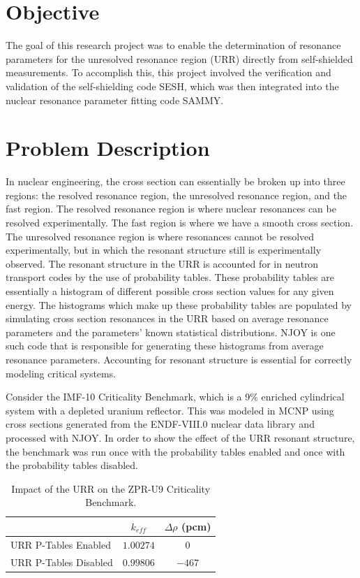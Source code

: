 \section{Objective}
    The goal of this research project was to enable the determination of resonance parameters for the unresolved resonance region (URR) directly from self-shielded measurements. To accomplish this, this project involved the verification and validation of the self-shielding code SESH\cite{sesh}, which was then integrated into the nuclear resonance parameter fitting code SAMMY\cite{sammy}.


\section{Problem Description}

    In nuclear engineering, the cross section can essentially be broken up into three regions: the resolved resonance region, the unresolved resonance region, and the fast region. The resolved resonance region is where nuclear resonances can be resolved experimentally. The fast region is where we have a smooth cross section. The unresolved resonance region is where resonances cannot be resolved experimentally, but in which the resonant structure still is experimentally observed. The resonant structure in the URR is accounted for in neutron transport codes by the use of probability tables. These probability tables are essentially a histogram of different possible cross section values for any given energy. The histograms which make up these probability tables are populated by simulating cross section resonances in the URR based on average resonance parameters and the parameters' known statistical distributions. NJOY\cite{njoy} is one such code that is responsible for generating these histograms from average resonance parameters. Accounting for resonant structure is essential for correctly modeling critical systems.





    Consider the IMF-10 Criticality Benchmark\cite{icsbep}, which is a 9\% enriched cylindrical system with a depleted uranium reflector. This was modeled in MCNP using cross sections generated from the ENDF-VIII.0 nuclear data library\cite{endf-8} and processed with NJOY. In order to show the effect of the URR resonant structure, the benchmark was run once with the probability tables enabled and once with the probability tables disabled.

    \begin{table}[h!]
        \centering
        \caption{Impact of the URR on the ZPR-U9 Criticality Benchmark.}
        \begin{tabular}{|l  c  c|}
            \hline
            ~                       &   $k_{eff}$   & $\Delta \rho$ (pcm) \\
            \hline
            URR P-Tables Enabled    &   $1.00274$   & $0$ \\
            URR P-Tables Disabled   &   $0.99806$   &   $-467$ \\
            \hline
        \end{tabular}
        \label{tab:criticality-benchmark}
    \end{table}
    
